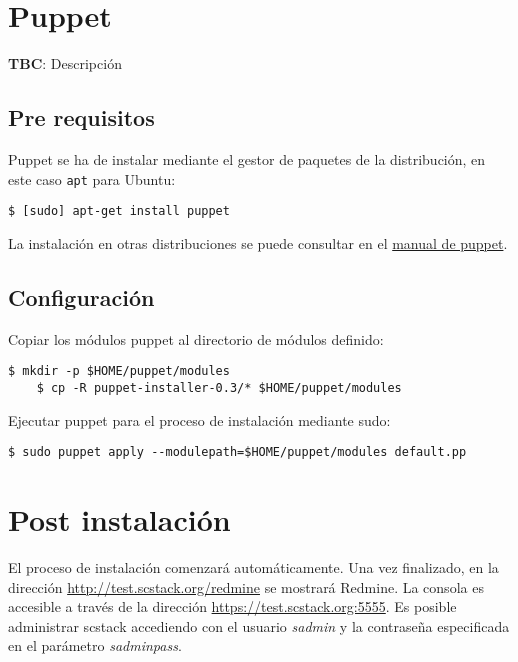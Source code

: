\section{Puppet}
\label{puppet}

\textbf{TBC}: Descripción

\subsection{Pre requisitos}
\label{sub:puppet-pre-requisitos}

\par Puppet se ha de instalar mediante el gestor de paquetes de la distribución, en este caso \texttt{apt} para Ubuntu:

\lstset{style=rubybasico}
\begin{lstlisting}[frame=trbl]
    $ [sudo] apt-get install puppet
\end{lstlisting}

\par La instalación en otras distribuciones se puede consultar en el \href{http://docs.puppetlabs.com/guides/installation.html}{manual de puppet}.

\subsection{Configuración}
\label{sub:configuracion-puppet}

\par Copiar los módulos puppet al directorio de módulos definido:

\lstset{style=rubybasico}
\begin{lstlisting}[frame=trbl]
    $ mkdir -p $HOME/puppet/modules
    $ cp -R puppet-installer-0.3/* $HOME/puppet/modules
\end{lstlisting}

\par Ejecutar puppet para el proceso de instalación mediante sudo:

\lstset{style=rubybasico}
\begin{lstlisting}[frame=trbl]
    $ sudo puppet apply --modulepath=$HOME/puppet/modules default.pp
\end{lstlisting}

\section{Post instalación}
\label{sec:post-instalacion}

\par El proceso de instalación comenzará automáticamente. Una vez finalizado, en la dirección
\href{http://test.scstack.org/redmine}{http://test.scstack.org/redmine} se mostrará Redmine. La consola es accesible a través de la dirección \href{https://test.scstack.org:5555}{https://test.scstack.org:5555}. Es posible administrar scstack accediendo con el usuario \emph{sadmin} y la contraseña especificada en el parámetro \emph{sadminpass}.

